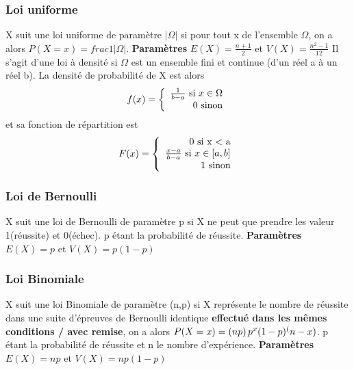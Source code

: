 \documentclass[a4paper]{article}
\begin{document}
\subsubsection{Loi uniforme}
X suit une loi uniforme de paramètre $| \Omega |$ si pour tout x de l'ensemble $\Omega$, on a alors $P(X=x)=frac{1}{|\Omega |}$. \newline
\textbf{Paramètres}
$E(X) = \frac{n+1}{2}$ et $ V(X)=\frac{n^2-1}{12}$ \newline
Il s'agit d'une loi à densité si $\Omega$ est un ensemble fini et continue (d'un réel a à un réel b). La densité de probabilité de X est alors 
\begin{eqnarray}
f(x) = \left \{
\begin{array}{r l l}
\frac{1}{b-a} \text{ si $x \in \Omega$} \\
0 \text{ sinon} \\
\end{array}
\right . 
\end{eqnarray} et sa fonction de répartition est 
\begin{eqnarray}
F(x) = \left \{
\begin{array}{r l l}
0 \text{ si x < a} \\
\frac{x-a}{b-a} \text{ si $x \in [a,b]$} \\
1 \text{ sinon} \\
\end{array}
\right . 
\end{eqnarray}
\subsubsection{Loi de Bernoulli}
X suit une loi de Bernoulli de paramètre p si X ne peut que prendre les valeur 1(réussite) et 0(échec). p étant la probabilité de réussite. \newline
\textbf{Paramètres}
$E(X) = p$ et $ V(X)=p(1-p)$
\subsubsection{Loi Binomiale}
X suit une loi Binomiale de paramètre (n,p) si X représente le nombre de réussite dans une suite d'épreuves de Bernoulli identique \textbf{effectué dans les mêmes conditions / avec remise}, on a alors $P(X=x)=\left( n \\ p \right) p^x (1-p)^(n-x)$. p étant la probabilité de réussite et n le nombre d'expérience. \newline
\textbf{Paramètres} 
$E(X) = np$ et $ V(X)=np(1-p)$
\end{document}
